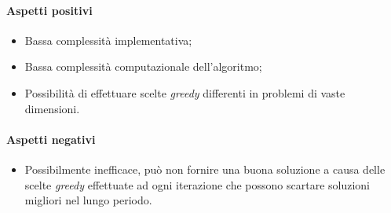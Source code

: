 \noindent \paragraph{Aspetti positivi}
\begin{itemize}
    \item Bassa complessità implementativa;
    \item Bassa complessità computazionale dell'algoritmo;
    \item Possibilità di effettuare scelte \textit{greedy} differenti in problemi di vaste dimensioni.
\end{itemize}
\noindent \paragraph{Aspetti negativi}
\begin{itemize}
    \item Possibilmente inefficace, può non fornire una buona soluzione a causa
    delle scelte \textit{greedy} effettuate ad ogni iterazione che possono scartare soluzioni
    migliori nel lungo periodo.
\end{itemize}
